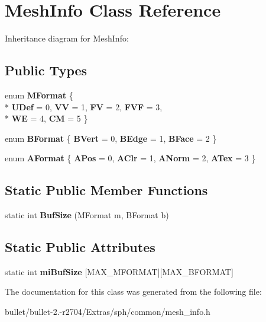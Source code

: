 \hypertarget{class_mesh_info}{\section{Mesh\+Info Class Reference}
\label{class_mesh_info}
}


Inheritance diagram for Mesh\+Info\+:
\subsection*{Public Types}
\begin{DoxyCompactItemize}
\item 
\hypertarget{class_mesh_info_aa673bc82a79f19948cf1fc81991d97e7}{enum {\bfseries M\+Format} \{ \\*
{\bfseries U\+Def} = 0, 
{\bfseries V\+V} = 1, 
{\bfseries F\+V} = 2, 
{\bfseries F\+V\+F} = 3, 
\\*
{\bfseries W\+E} = 4, 
{\bfseries C\+M} = 5
 \}}\label{class_mesh_info_aa673bc82a79f19948cf1fc81991d97e7}

\item 
\hypertarget{class_mesh_info_a9db99dcf8dc3dbf8a97c22a21975de56}{enum {\bfseries B\+Format} \{ {\bfseries B\+Vert} = 0, 
{\bfseries B\+Edge} = 1, 
{\bfseries B\+Face} = 2
 \}}\label{class_mesh_info_a9db99dcf8dc3dbf8a97c22a21975de56}

\item 
\hypertarget{class_mesh_info_ae0a931e62c0be7d32906f687bc74a8fc}{enum {\bfseries A\+Format} \{ {\bfseries A\+Pos} = 0, 
{\bfseries A\+Clr} = 1, 
{\bfseries A\+Norm} = 2, 
{\bfseries A\+Tex} = 3
 \}}\label{class_mesh_info_ae0a931e62c0be7d32906f687bc74a8fc}

\end{DoxyCompactItemize}
\subsection*{Static Public Member Functions}
\begin{DoxyCompactItemize}
\item 
\hypertarget{class_mesh_info_a5176b78544688478fc9ec91b90a2d65c}{static int {\bfseries Buf\+Size} (M\+Format m, B\+Format b)}\label{class_mesh_info_a5176b78544688478fc9ec91b90a2d65c}

\end{DoxyCompactItemize}
\subsection*{Static Public Attributes}
\begin{DoxyCompactItemize}
\item 
\hypertarget{class_mesh_info_aa28f6a6f25e47894696cbfaa9cb95c51}{static int {\bfseries mi\+Buf\+Size} \mbox{[}M\+A\+X\+\_\+\+M\+F\+O\+R\+M\+A\+T\mbox{]}\mbox{[}M\+A\+X\+\_\+\+B\+F\+O\+R\+M\+A\+T\mbox{]}}\label{class_mesh_info_aa28f6a6f25e47894696cbfaa9cb95c51}

\end{DoxyCompactItemize}


The documentation for this class was generated from the following file\+:\begin{DoxyCompactItemize}
\item 
bullet/bullet-\/2.-\/r2704/\+Extras/sph/common/mesh\+\_\+info.\+h\end{DoxyCompactItemize}
